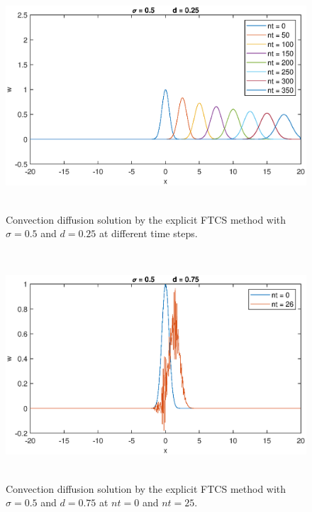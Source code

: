 \documentclass[letterpaper,12pt]{article}
\begin{document}
\begin{figure}[H] 
	\centering 
	\includegraphics[max height=8.5cm]{graphs/FTCS/ConvectionDiffusion/sigma05d025.eps}
	\caption{Convection diffusion solution by the explicit FTCS method with $\sigma= 0.5$ and $d=0.25$ at different time steps.}
	 \label{fig:FTCSsigma05d025}
\end{figure}
\vspace{1cm}
\begin{figure}[H] 
	\centering 
	\includegraphics[max height=8.5cm]{graphs/FTCS/ConvectionDiffusion/sigma05d075.eps}
	\caption{Convection diffusion solution by the explicit FTCS method with $\sigma= 0.5$ and $d=0.75$ at $nt=0$ and $nt=25$.}
	 \label{fig:FTCSsigma05d075}
\end{figure}

\newpage
\end{document}
